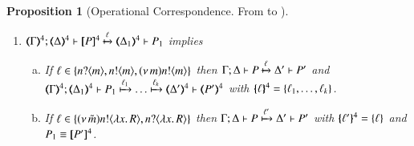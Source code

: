 \documentclass[preprint,11pt]{elsarticle}
\newtheorem{proposition}{Proposition}[section]
\begin{document}
{{\begin{proposition}[Operational Correspondence. From \pHOp to \HOp]
\begin{enumerate}
\begin{enumerate}[a)]
				\item	If $\ell = \bactinp{n}{\widetilde{m}}$ with $|\widetilde{m}| = k$ then
					$\horel{\tmap{\Gamma}{4}}{\tmap{\Delta}{4}}{\pmap{P}{4}}{\hby{\ell_1} \dots \hby{\ell_k}}{\tmap{\Delta'}{4}}{\pmap{P}{4}}$
					with $\mapa{\ell}^{4} = \{\ell_1, \dots, \ell_k\}$.

				\item	If $\ell \in \set{\news{\tilde{m}} \bactout{n}{\abs{\tilde{x}}{R}}, \bactinp{n}{\abs{\tilde{x}}{R}}}$ then
					$\horel{\tmap{\Gamma}{4}}{\tmap{\Delta}{4}}{\pmap{P}{4}}{\hby{\ell'}}
					{\tmap{\Delta'}{4}}{\pmap{P'}{4}}$ with $\mapa{\ell}^{4} = \{\ell'\}$.

				\item	If $\ell \in \set{\bactsel{n}{l}, \bactbra{n}{l}}$ then
					$\horel{\tmap{\Gamma}{4}}{\tmap{\Delta}{4}}{\pmap{P}{4}}{\hby{\ell}}
					{\tmap{\Delta'}{4}}{\pmap{P'}{4}}$.

				\item	If $\ell = \btau$ then %
					$\horel{\tmap{\Gamma}{4}}{\tmap{\Delta}{4}}{\pmap{P}{4}}{\hby{\btau} \hby{\stau} \dots \hby{\stau}}
					{\tmap{\Delta'}{4}}{\pmap{P'}{4}}$ with $\mapa{\ell} = \{\btau, \stau, \dots, \stau\}$.

				\item	If $\ell = \tau$ then %
					$\horel{\tmap{\Gamma}{4}}{\tmap{\Delta}{4}}{\pmap{P}{4}}{\hby{\tau} \dots \hby{\tau}}
					{\tmap{\Delta'}{4}}{\pmap{P'}{4}}$ with $\mapa{\ell}^{4} = \{\tau, \dots, \tau\}$.
			\end{enumerate}

		\item	%
			$\horel{\tmap{\Gamma}{4}}{\tmap{\Delta}{4}}{\pmap{P}{4}}{\hby{\ell}}
			{\tmap{\Delta_1}{4}}{P_1}$ implies
%
			\begin{enumerate}[a)]
				\item	If $\ell \in \{n ? \langle m \rangle, n ! \langle m \rangle, (\nu\, m) n ! \langle m \rangle\}$ then
					$\Gamma; \Delta \vdash P \xmapsto{\ell} \Delta' \vdash P'$ and\\
					$\horel{\tmap{\Gamma}{4}}{\tmap{\Delta_1}{4}}{P_1}{\hby{\ell_1} \dots \hby{\ell_k}}
					{\tmap{\Delta'}{4}}{\tmap{P'}{4}}$ with $\mapa{\ell}^{4} = \{\ell_1, \dots, \ell_k\}$.

				\item	If $\ell \in \{(\nu\, \tilde{m}) n ! \langle \lambda x.\,R \rangle, n ? \langle \lambda x.\,R \rangle\}$
					then
					$\Gamma; \Delta \vdash P \xmapsto{\ell'} \Delta' \vdash P'$
					with $\{\!\!\{\ell'\}\!\!\}^{4} = \{\ell\}$ and $P_1 \equiv [\!\![P']\!\!]^4$.


\end{enumerate}
\end{enumerate}
\end{proposition}}}
\end{document}
